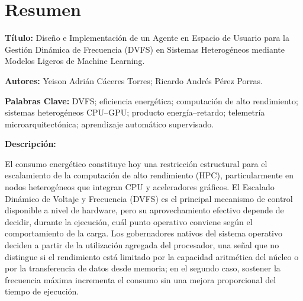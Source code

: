 \documentclass[12pt,oneside,spanish]{book}
\begin{document}
\vspace{1cm}



\chapter*{Resumen}

\vspace{1cm}

\noindent\textbf{Título:} Diseño e Implementación de un Agente en Espacio de Usuario para la Gestión Dinámica de Frecuencia (DVFS) en Sistemas Heterogéneos mediante Modelos Ligeros de Machine Learning.

\medskip

\noindent\textbf{Autores:} Yeison Adrián Cáceres Torres; Ricardo Andrés Pérez Porras.

\medskip

\noindent\textbf{Palabras Clave:} DVFS; eficiencia energética; computación de alto rendimiento; sistemas heterogéneos CPU--GPU; producto energía--retardo; telemetría microarquitectónica; aprendizaje automático supervisado.

\vspace{0.5cm}

\noindent\textbf{Descripción:}

El consumo energético constituye hoy una restricción estructural para el escalamiento de la computación de alto rendimiento (HPC), particularmente en nodos heterogéneos que integran CPU y aceleradores gráficos. El Escalado Dinámico de Voltaje y Frecuencia (DVFS) es el principal mecanismo de control disponible a nivel de hardware, pero su aprovechamiento efectivo depende de decidir, durante la ejecución, cuál punto operativo conviene según el comportamiento de la carga. Los gobernadores nativos del sistema operativo deciden a partir de la utilización agregada del procesador, una señal que no distingue si el rendimiento está limitado por la capacidad aritmética del núcleo o por la transferencia de datos desde memoria; en el segundo caso, sostener la frecuencia máxima incrementa el consumo sin una mejora proporcional del tiempo de ejecución.
\end{document}
